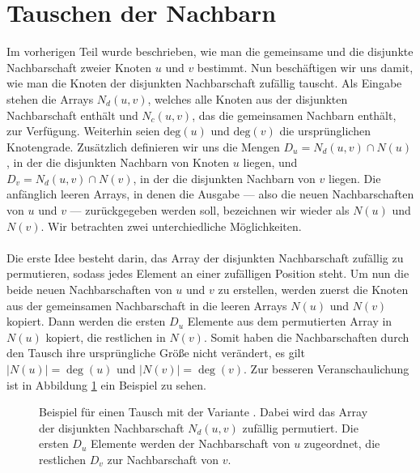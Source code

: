 \section{Tauschen der Nachbarn}
\label{sec:trade}
Im vorherigen Teil wurde beschrieben, wie man die gemeinsame und die disjunkte Nachbarschaft zweier Knoten
$u$ und $v$ bestimmt. Nun beschäftigen wir uns damit, wie man die Knoten der disjunkten Nachbarschaft zufällig tauscht. Als Eingabe 
stehen die Arrays $N_{d}(u,v)$, welches alle Knoten aus der disjunkten Nachbarschaft enthält
und $N_{c}(u,v)$, das die gemeinsamen Nachbarn enthält, zur Verfügung. Weiterhin seien $\text{deg}(u)$ und
$\text{deg}(v)$ die ursprünglichen Knotengrade. Zusätzlich definieren wir uns die Mengen
$D_{u} = N_{d}(u,v) \cap N(u)$, in der die disjunkten Nachbarn von Knoten $u$ liegen, 
und $D_{v} = N_{d}(u,v) \cap N(v)$, in der die disjunkten Nachbarn von $v$ liegen. Die anfänglich
leeren Arrays, in denen die Ausgabe --- also die neuen Nachbarschaften von $u$ und $v$ --- zurückgegeben 
werden soll, bezeichnen wir wieder als $N(u)$ und $N(v)$.
Wir betrachten zwei unterchiedliche Möglichkeiten.
\\
\\
Die erste Idee besteht darin,  
das Array der disjunkten Nachbarschaft zufällig zu permutieren, sodass jedes Element an 
einer zufälligen Position steht. Um nun die beide \glqq neuen\grqq{} Nachbarschaften von $u$ und $v$ zu erstellen,
werden zuerst die Knoten aus der gemeinsamen Nachbarschaft in die leeren Arrays $N(u)$ und $N(v)$ kopiert.
Dann werden die ersten $D_{u}$ Elemente aus dem permutierten Array in $N(u)$ kopiert, die restlichen
in $N(v)$. Somit haben die Nachbarschaften durch den Tausch ihre ursprüngliche Größe nicht verändert, es gilt $|N(u)| = \deg(u)$ und
$|N(v)| = \deg(v)$.
Zur besseren Veranschaulichung ist in Abbildung \ref{fig:trade_shuffle} ein Beispiel zu sehen.
\begin{figure}
\centering
  \caption{Beispiel für einen Tausch mit der Variante \perm. Dabei wird das Array der 
  disjunkten Nachbarschaft $N_{d}(u,v)$ zufällig permutiert. Die ersten $D_{u}$ Elemente werden der Nachbarschaft
  von $u$ zugeordnet, die restlichen $D_{v}$ zur Nachbarschaft von $v$. }
  \label{fig:trade_shuffle}
\end{figure}
